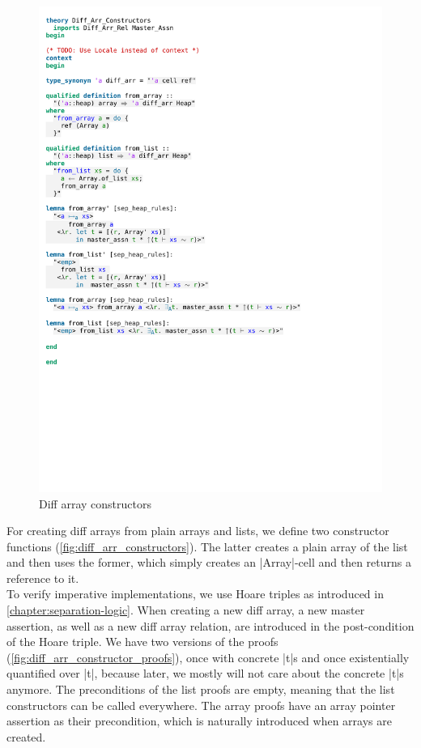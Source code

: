 \begin{figure}[htpb]
    \includegraphics[trim={0 18cm 0 5,2cm}, clip, width=1.00\textwidth]{figures/Theory_Diff_Arr_Constructors.pdf}
    \caption[Diff array constructors]{Diff array constructors}
    \label{fig:diff_arr_constructors}
\end{figure}

\noindent For creating diff arrays from plain arrays and lists, we define two constructor functions (\autoref{fig:diff_arr_constructors}). The latter creates a plain array of the list and then uses the former, which simply creates an |Array|-cell and then returns a reference to it.\\
To verify imperative implementations, we use Hoare triples as introduced in \autoref{chapter:separation-logic}. When creating a new diff array, a new master assertion, as well as a new diff array relation, are introduced in the post-condition of the Hoare triple. We have two versions of the proofs (\autoref{fig:diff_arr_constructor_proofs}), once with concrete |t|s and once existentially quantified over |t|, because later, we mostly will not care about the concrete |t|s anymore. The preconditions of the list proofs are empty, meaning that the list constructors can be called everywhere. The array proofs have an array pointer assertion as their precondition, which is naturally introduced when arrays are created.

